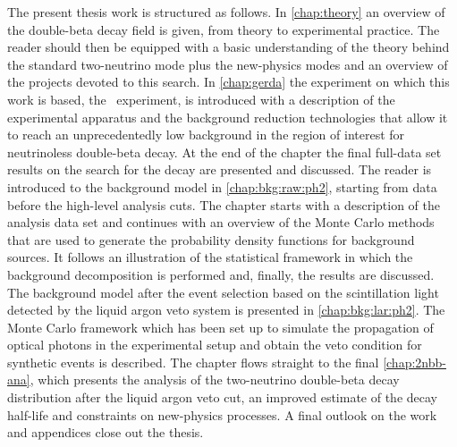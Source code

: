 The present thesis work is structured as follows. In \cref{chap:theory} an overview of the
double-beta decay field is given, from theory to experimental practice. The reader should
then be equipped with a basic understanding of the theory behind the standard two-neutrino
mode plus the new-physics modes and an overview of the projects devoted to this search. In
\cref{chap:gerda} the experiment on which this work is based, the \gerda\ experiment, is
introduced with a description of the experimental apparatus and the background reduction
technologies that allow it to reach an unprecedentedly low background in the region of
interest for neutrinoless double-beta decay. At the end of the chapter the final full-data
set results on the search for the decay are presented and discussed. The reader is
introduced to the background model in \cref{chap:bkg:raw:ph2}, starting from data before
the high-level analysis cuts. The chapter starts with a description of the analysis data
set and continues with an overview of the Monte Carlo methods that are used to generate
the probability density functions for background sources. It follows an illustration of
the statistical framework in which the background decomposition is performed and, finally,
the results are discussed. The background model after the event selection based on the
scintillation light detected by the liquid argon veto system is presented in
\cref{chap:bkg:lar:ph2}. The Monte Carlo framework which has been set up to simulate the
propagation of optical photons in the experimental setup and obtain the veto condition for
synthetic events is described. The chapter flows straight to the final \cref{chap:2nbb-ana},
which presents the analysis of the two-neutrino double-beta decay distribution after the
liquid argon veto cut, an improved estimate of the decay half-life and constraints on
new-physics processes. A final outlook on the work and appendices close out the thesis.


